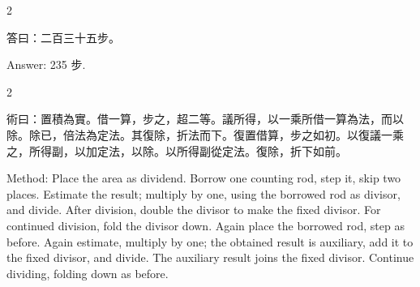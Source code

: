 \documentclass[10pt,a4paper]{article}
\begin{document}
\begin{paracol}{2}

\begin{leftcolumn*}
\begin{answerbi}[\textbf{答}]
答曰：二百三十五步。
\end{answerbi}
\end{leftcolumn*}

\begin{rightcolumn*}
\begin{answerbi}
Answer: 235 步.
\end{answerbi}
\end{rightcolumn*}

\end{paracol}

\begin{paracol}{2}

\begin{leftcolumn*}
\begin{methodbi}
術曰：置積為實。借一算，步之，超二等。議所得，以一乘所借一算為法，而以除。除已，倍法為定法。其復除，折法而下。復置借算，步之如初。以復議一乘之，所得副，以加定法，以除。以所得副從定法。復除，折下如前。
\end{methodbi}
\end{leftcolumn*}

\begin{rightcolumn*}
\begin{methodbi}
Method: Place the area as dividend. Borrow one counting rod, step it, skip two places. Estimate the result; multiply by one, using the borrowed rod as divisor, and divide. After division, double the divisor to make the fixed divisor. For continued division, fold the divisor down. Again place the borrowed rod, step as before. Again estimate, multiply by one; the obtained result is auxiliary, add it to the fixed divisor, and divide. The auxiliary result joins the fixed divisor. Continue dividing, folding down as before.
\end{methodbi}
\end{rightcolumn*}

\end{paracol}
\end{document}
